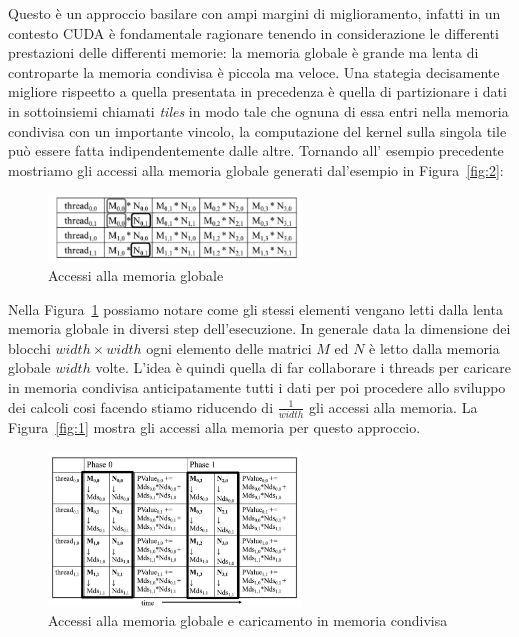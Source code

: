 \documentclass[a4paper]{article}
\begin{document}
Questo è un approccio basilare con ampi margini di miglioramento, infatti in un contesto CUDA è fondamentale ragionare tenendo in considerazione le differenti prestazioni delle differenti memorie: la memoria globale è grande ma lenta di controparte la memoria condivisa è piccola ma veloce. Una stategia decisamente migliore rispeetto a quella presentata in precedenza è quella di partizionare i dati in sottoinsiemi chiamati \textit{tiles} in modo tale che ognuna di essa entri nella memoria condivisa con un importante vincolo, la computazione del kernel sulla singola tile può essere fatta indipendentemente dalle altre. Tornando all' esempio precedente mostriamo gli accessi alla memoria globale generati dal'esempio in Figura~\ref{fig:2}:

\begin{figure}[H]
    \centering
    \includegraphics[width=0.6\textwidth]{imgs/memory_access.png}
    \caption{Accessi alla memoria globale}
    \label{fig:3}
\end{figure}

Nella Figura~\ref{fig:3} possiamo notare come gli stessi elementi vengano letti dalla lenta memoria globale in diversi step dell'esecuzione. In generale data la dimensione dei blocchi $width\times{width}$ ogni elemento delle matrici $M$ ed $N$ è letto dalla memoria globale $width$ volte. L'idea è quindi quella di far collaborare i threads per caricare in memoria condivisa anticipatamente tutti i dati per poi procedere allo sviluppo dei calcoli cosi facendo stiamo riducendo di $\frac{1}{width}$ gli accessi alla memoria. La Figura~\ref{fig:1} mostra gli accessi alla memoria per questo approccio.

\begin{figure}[H]
    \centering
    \includegraphics[width=0.6\textwidth]{imgs/memory_access1.png}
    \caption{Accessi alla memoria globale e caricamento in memoria condivisa}
    \label{fig:4}
\end{figure}
\end{document}
